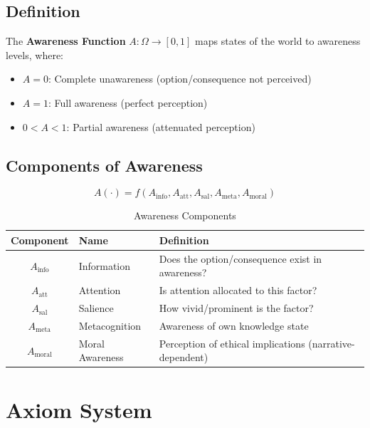 \subsection{Definition}

\begin{definition}
The \textbf{Awareness Function} $A: \Omega \to [0, 1]$ maps states of the world
to awareness levels, where:
\begin{itemize}
\item $A = 0$: Complete unawareness (option/consequence not perceived)
\item $A = 1$: Full awareness (perfect perception)
\item $0 < A < 1$: Partial awareness (attenuated perception)
\end{itemize}
\end{definition}

\subsection{Components of Awareness}

\begin{equation}
A(\cdot) = f(A_{\text{info}}, A_{\text{att}}, A_{\text{sal}}, A_{\text{meta}}, A_{\text{moral}})
\end{equation}

\begin{table}[htbp]
\centering
\caption{Awareness Components}
\label{tab:aware-components}
\renewcommand{\arraystretch}{1.3}
\begin{tabular}{@{}clp{5cm}@{}}
\toprule
\textbf{Component} & \textbf{Name} & \textbf{Definition} \\
\midrule
$A_{\text{info}}$ & Information & Does the option/consequence exist in awareness? \\
$A_{\text{att}}$ & Attention & Is attention allocated to this factor? \\
$A_{\text{sal}}$ & Salience & How vivid/prominent is the factor? \\
$A_{\text{meta}}$ & Metacognition & Awareness of own knowledge state \\
$A_{\text{moral}}$ & Moral Awareness & Perception of ethical implications (narrative-dependent) \\
\bottomrule
\end{tabular}
\end{table}

\section{Axiom System}
\label{sec:aware-axioms}

